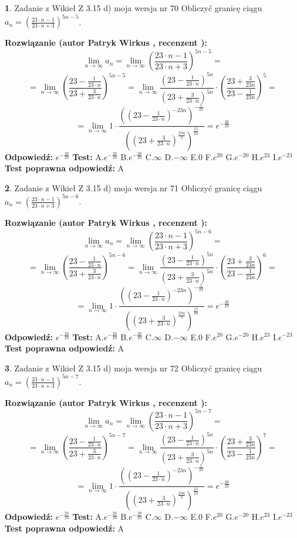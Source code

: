 \documentclass[12pt, a4paper]{article}
\theoremstyle{definition} %
\newtheorem{zad}{}
\newcommand{\zadStart}[1]{\begin{zad}#1\newline}
\newcommand{\zadStop}{\end{zad}}
\newcommand{\rozwStart}[2]{\noindent \textbf{Rozwiązanie (autor #1 , recenzent #2): }\newline}
\newcommand{\rozwStop}{\newline}
\newcommand{\odpStart}{\noindent \textbf{Odpowiedź:}\newline}
\newcommand{\odpStop}{\newline}
\newcommand{\testStart}{\noindent \textbf{Test:}\newline}
\newcommand{\testStop}{\newline}
\newcommand{\kluczStart}{\noindent \textbf{Test poprawna odpowiedź:}\newline}
\newcommand{\kluczStop}{\newline}
\begin{document}
\zadStart{Zadanie z Wikieł Z 3.15 d) moja wersja nr 70}
Obliczyć granicę ciągu $a_{n}=(\frac{23\cdot n - 1}{23 \cdot n + 3})^{5n-5}$.
\zadStop
\rozwStart{Patryk Wirkus}{}
$$\lim\limits_{n\to\infty} a_{n} = \lim\limits_{n\to\infty}(\frac{23\cdot n - 1}{23 \cdot n + 3})^{5n-5}=$$
$$=\lim\limits_{n\to\infty}(\frac{23 - \frac{1}{23\cdot n}}{23 + \frac{3}{23 \cdot n}})^{5n-5}=\lim\limits_{n\to\infty}\frac{(23 - \frac{1}{23\cdot n})^{5n}}{(23 + \frac{3}{23\cdot n})^{5n}} \cdot (\frac{23+\frac{3}{23n}}{23-\frac{1}{23n}})^{5}=$$
$$=\lim\limits_{n\to\infty} 1 \cdot \frac{((23-\frac{1}{23 \cdot n})^{-23n})^{-\frac{5}{23}}}{((23+\frac{3}{23 \cdot n})^{\frac{23n}{3}})^{\frac{15}{23}}} =e^{-\frac{20}{23}}$$
\rozwStop
\odpStart
$e^{-\frac{20}{23}}$
\odpStop
\testStart
A.$ e^{-\frac{20}{23}}$
B.$ e^{-\frac{20}{23}}$
C.$\infty$
D.$-\infty$
E.$0$
F.$e^{20}$
G.$e^{-20}$
H.$e^{23}$
I.$e^{-23}$
\testStop
\kluczStart
A
\kluczStop



\zadStart{Zadanie z Wikieł Z 3.15 d) moja wersja nr 71}
Obliczyć granicę ciągu $a_{n}=(\frac{23\cdot n - 1}{23 \cdot n + 3})^{5n-6}$.
\zadStop
\rozwStart{Patryk Wirkus}{}
$$\lim\limits_{n\to\infty} a_{n} = \lim\limits_{n\to\infty}(\frac{23\cdot n - 1}{23 \cdot n + 3})^{5n-6}=$$
$$=\lim\limits_{n\to\infty}(\frac{23 - \frac{1}{23\cdot n}}{23 + \frac{3}{23 \cdot n}})^{5n-6}=\lim\limits_{n\to\infty}\frac{(23 - \frac{1}{23\cdot n})^{5n}}{(23 + \frac{3}{23\cdot n})^{5n}} \cdot (\frac{23+\frac{3}{23n}}{23-\frac{1}{23n}})^{6}=$$
$$=\lim\limits_{n\to\infty} 1 \cdot \frac{((23-\frac{1}{23 \cdot n})^{-23n})^{-\frac{5}{23}}}{((23+\frac{3}{23 \cdot n})^{\frac{23n}{3}})^{\frac{15}{23}}} =e^{-\frac{20}{23}}$$
\rozwStop
\odpStart
$e^{-\frac{20}{23}}$
\odpStop
\testStart
A.$ e^{-\frac{20}{23}}$
B.$ e^{-\frac{20}{23}}$
C.$\infty$
D.$-\infty$
E.$0$
F.$e^{20}$
G.$e^{-20}$
H.$e^{23}$
I.$e^{-23}$
\testStop
\kluczStart
A
\kluczStop



\zadStart{Zadanie z Wikieł Z 3.15 d) moja wersja nr 72}
Obliczyć granicę ciągu $a_{n}=(\frac{23\cdot n - 1}{23 \cdot n + 3})^{5n-7}$.
\zadStop
\rozwStart{Patryk Wirkus}{}
$$\lim\limits_{n\to\infty} a_{n} = \lim\limits_{n\to\infty}(\frac{23\cdot n - 1}{23 \cdot n + 3})^{5n-7}=$$
$$=\lim\limits_{n\to\infty}(\frac{23 - \frac{1}{23\cdot n}}{23 + \frac{3}{23 \cdot n}})^{5n-7}=\lim\limits_{n\to\infty}\frac{(23 - \frac{1}{23\cdot n})^{5n}}{(23 + \frac{3}{23\cdot n})^{5n}} \cdot (\frac{23+\frac{3}{23n}}{23-\frac{1}{23n}})^{7}=$$
$$=\lim\limits_{n\to\infty} 1 \cdot \frac{((23-\frac{1}{23 \cdot n})^{-23n})^{-\frac{5}{23}}}{((23+\frac{3}{23 \cdot n})^{\frac{23n}{3}})^{\frac{15}{23}}} =e^{-\frac{20}{23}}$$
\rozwStop
\odpStart
$e^{-\frac{20}{23}}$
\odpStop
\testStart
A.$ e^{-\frac{20}{23}}$
B.$ e^{-\frac{20}{23}}$
C.$\infty$
D.$-\infty$
E.$0$
F.$e^{20}$
G.$e^{-20}$
H.$e^{23}$
I.$e^{-23}$
\testStop
\kluczStart
A
\kluczStop
\end{document}
